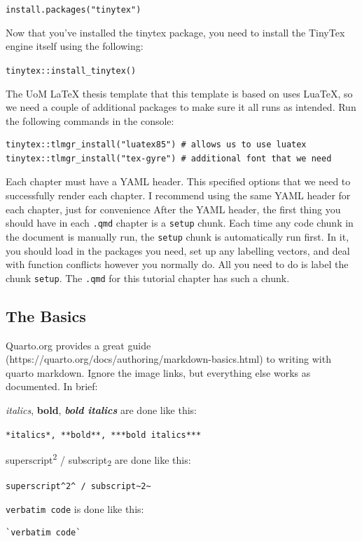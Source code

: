 \documentclass[../main.tex]{subfiles}
\begin{document}
\texttt{install.packages("tinytex")}

Now that you've installed the tinytex package, you need to install the
TinyTex engine itself using the following:

\texttt{tinytex::install\_tinytex()}

The UoM LaTeX thesis template that this template is based on uses
LuaTeX, so we need a couple of additional packages to make sure it all
runs as intended. Run the following commands in the console:

\begin{verbatim}
tinytex::tlmgr_install("luatex85") # allows us to use luatex
tinytex::tlmgr_install("tex-gyre") # additional font that we need
\end{verbatim}

Each chapter must have a YAML header. This specified options that we
need to successfully render each chapter. I recommend using the same
YAML header for each chapter, just for convenience After the YAML
header, the first thing you should have in each \texttt{.qmd} chapter is
a \texttt{setup} chunk. Each time any code chunk in the document is
manually run, the \texttt{setup} chunk is automatically run first. In
it, you should load in the packages you need, set up any labelling
vectors, and deal with function conflicts however you normally do. All
you need to do is label the chunk \texttt{setup}. The \texttt{.qmd} for
this tutorial chapter has such a chunk.

\subsection{The Basics}\label{the-basics}

Quarto.org provides a great guide
(https://quarto.org/docs/authoring/markdown-basics.html) to writing with
quarto markdown. Ignore the image links, but everything else works as
documented. In brief:

\emph{italics}, \textbf{bold}, \textbf{\emph{bold italics}} are done
like this:

\texttt{*italics*,\ **bold**,\ ***bold\ italics***}

superscript\textsuperscript{2} / subscript\textsubscript{2} are done
like this:

\texttt{superscript\^{}2\^{}\ /\ subscript\textasciitilde{}2\textasciitilde{}}

\texttt{verbatim\ code} is done like this:

\begin{verbatim}
`verbatim code`
\end{verbatim}
\end{document}
